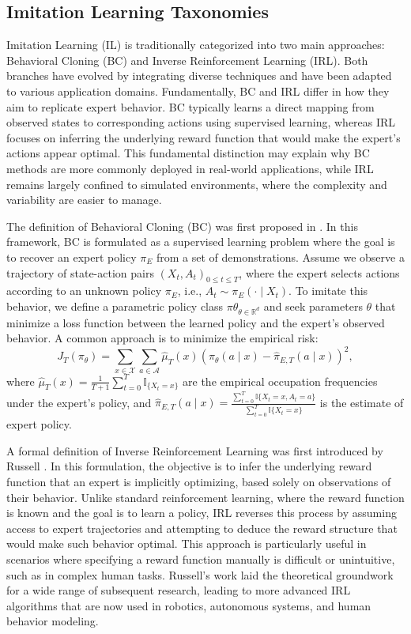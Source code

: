 \subsection{Imitation Learning Taxonomies}
Imitation Learning (IL) is traditionally categorized into two main approaches: Behavioral Cloning (BC) and Inverse Reinforcement Learning (IRL). Both branches have evolved by integrating diverse techniques and have been adapted to various application domains. Fundamentally, BC and IRL differ in how they aim to replicate expert behavior. BC typically learns a direct mapping from observed states to corresponding actions using supervised learning, whereas IRL focuses on inferring the underlying reward function that would make the expert's actions appear optimal. This fundamental distinction may explain why BC methods are more commonly deployed in real-world applications, while IRL remains largely confined to simulated environments, where the complexity and variability are easier to manage. \autocite{zheng2022imitationlearningprogresstaxonomies}

The definition of Behavioral Cloning (BC) was first proposed in \autocite{bain1995framework}. In this framework, BC is formulated as a supervised learning problem where the goal is to recover an expert policy $\pi_E$ from a set of demonstrations. Assume we observe a trajectory of state-action pairs ${(X_t, A_t)}_{0 \le t \le T}$, where the expert selects actions according to an unknown policy $\pi_E$, i.e., $A_t \sim \pi_E(\cdot \mid X_t)$. To imitate this behavior, we define a parametric policy class ${\pi\theta}_{\theta \in \mathbb{R}^d}$ and seek parameters $\theta$ that minimize a loss function between the learned policy and the expert’s observed behavior. A common approach is to minimize the empirical risk:
\[
  J_T(\pi_\theta) = \sum_{x \in \mathcal{X}} \sum_{a \in \mathcal{A}} \hat{\mu}_T(x) \left( \pi_\theta(a \mid x) - \hat{\pi}_{E,T}(a \mid x) \right)^2,
\]
where $\hat{\mu}_T(x) = \frac{1}{T+1} \sum_{t=0}^T \mathbb{I}_{\{X_t = x\}}$
are the empirical occupation frequencies under the expert’s policy, and $\hat{\pi}_{E,T}(a \mid x) = \frac{\sum_{t=0}^T \mathbb{I}\{X_t = x, A_t = a\}}{\sum_{t=0}^T \mathbb{I}\{X_t = x\}}$ is the estimate of expert policy. \autocite{neu2012apprenticeshiplearningusinginverse}

A formal definition of Inverse Reinforcement Learning was first introduced by Russell \autocite{russell1998learning}. In this formulation, the objective is to infer the underlying reward function that an expert is implicitly optimizing, based solely on observations of their behavior. Unlike standard reinforcement learning, where the reward function is known and the goal is to learn a policy, IRL reverses this process by assuming access to expert trajectories and attempting to deduce the reward structure that would make such behavior optimal. This approach is particularly useful in scenarios where specifying a reward function manually is difficult or unintuitive, such as in complex human tasks. Russell’s work laid the theoretical groundwork for a wide range of subsequent research, leading to more advanced IRL algorithms that are now used in robotics, autonomous systems, and human behavior modeling.

